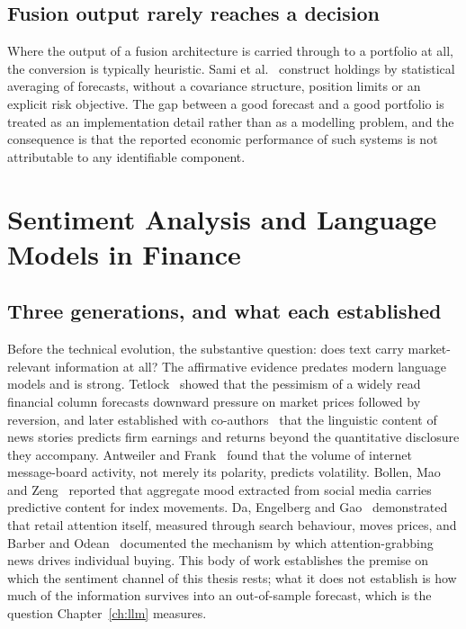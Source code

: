 \subsection{Fusion output rarely reaches a decision}

Where the output of a fusion architecture is carried through to a portfolio at all, the
conversion is typically heuristic. Sami et al.~\cite{sami2025} construct holdings by statistical
averaging of forecasts, without a covariance structure, position limits or an explicit risk
objective. The gap between a good forecast and a good portfolio is treated as an implementation
detail rather than as a modelling problem, and the consequence is that the reported economic
performance of such systems is not attributable to any identifiable component.

\section{Sentiment Analysis and Language Models in Finance}

\subsection{Three generations, and what each established}

Before the technical evolution, the substantive question: does text carry market-relevant
information at all? The affirmative evidence predates modern language models and is strong.
Tetlock~\cite{tetlock2007} showed that the pessimism of a widely read financial column forecasts
downward pressure on market prices followed by reversion, and later established with
co-authors~\cite{tetlock2008} that the linguistic content of news stories predicts firm earnings
and returns beyond the quantitative disclosure they accompany. Antweiler and
Frank~\cite{antweiler2004} found that the volume of internet message-board activity, not merely
its polarity, predicts volatility. Bollen, Mao and Zeng~\cite{bollen2011} reported that aggregate
mood extracted from social media carries predictive content for index movements. Da, Engelberg
and Gao~\cite{da2011attention} demonstrated that retail attention itself, measured through search
behaviour, moves prices, and Barber and Odean~\cite{barber2008} documented the mechanism by which
attention-grabbing news drives individual buying. This body of work establishes the premise on
which the sentiment channel of this thesis rests; what it does not establish is how much of the
information survives into an out-of-sample forecast, which is the question
Chapter~\ref{ch:llm} measures.

